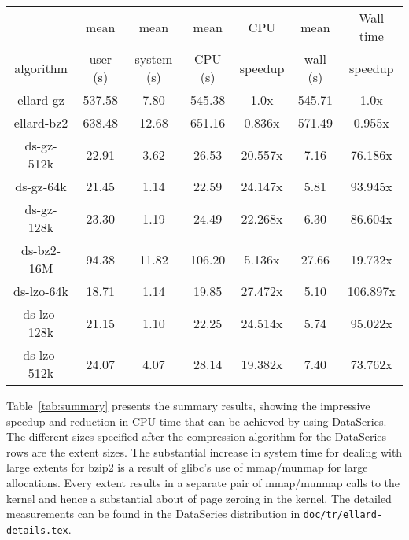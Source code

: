 \documentclass{acm_proc_article-sp}
\begin{document}
\begin{table*}
\centering
\begin{tabular}{|c|c|c|c|c|c|c|} \hline
            & mean     & mean       & mean     & CPU     & mean     & Wall time \\
algorithm   & user (s) & system (s) & CPU (s)  & speedup & wall (s) & speedup  \\ \hline
ellard-gz   & 537.58    &  7.80     & 545.38   &  1.0x   & 545.71   &   1.0x   \\
ellard-bz2  & 638.48    & 12.68     & 651.16   &  0.836x & 571.49   &   0.955x \\
\hline
ds-gz-512k  &  22.91    &  3.62     &  26.53   & 20.557x &   7.16   &  76.186x \\
ds-gz-64k   &  21.45    &  1.14     &  22.59   & 24.147x &   5.81   &  93.945x \\
ds-gz-128k  &  23.30    &  1.19     &  24.49   & 22.268x &   6.30   &  86.604x \\
\hline
ds-bz2-16M  &  94.38    & 11.82     & 106.20   &  5.136x &  27.66   &  19.732x \\
ds-lzo-64k  &  18.71    &  1.14     &  19.85   & 27.472x &   5.10   & 106.897x \\
ds-lzo-128k &  21.15    &  1.10     &  22.25   & 24.514x &   5.74   &  95.022x \\
ds-lzo-512k &  24.07    &  4.07     &  28.14   & 19.382x &   7.40   &  73.762x \\ \hline
\end{tabular}

\caption{Summary of performance results for the two analysis programs
operating on a variety of input files.  The analysis was run over the
anon-home04-011118-* files.  For the ellard \texttt{nfsscan} program
the text files were compressed with either gz or bz2.  For the
DataSeries \texttt{ellardanalysis} program, the dataseries files were
compressed with either gz, bz2, or lzo, and used various extent sizes
as specified.  CPU and wall time are both relative to ellard-gz.}

\label{tab:summary}
\end{table*}


Table~\ref{tab:summary} presents the summary results, showing the
impressive speedup and reduction in CPU time that can be achieved by
using DataSeries.  The different sizes specified after the compression
algorithm for the DataSeries rows are the extent sizes. 
The substantial increase in system time for dealing
with large extents for bzip2 is a result of glibc's use of mmap/munmap
for large allocations.  Every extent results in a separate pair of
mmap/munmap calls to the kernel and hence a substantial about of page
zeroing in the kernel.  The detailed measurements can be found 
in the DataSeries distribution in \texttt{doc/tr/ellard-details.tex}.
\end{document}
